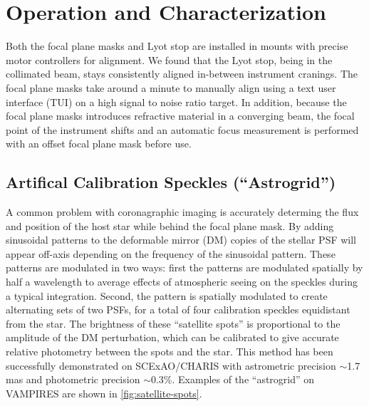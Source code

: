 \documentclass[]{spie}  %
\begin{document}
\section{Operation and Characterization}\label{sec:tests}

Both the focal plane masks and Lyot stop are installed in mounts with precise motor controllers for alignment. We found that the Lyot stop, being in the collimated beam, stays consistently aligned in-between instrument cranings. The focal plane masks take around a minute to manually align using a text user interface (TUI) on a high signal to noise ratio target. In addition, because the focal plane masks introduces refractive material in a converging beam, the focal point of the instrument shifts and an automatic focus measurement is performed with an offset focal plane mask before use.

\subsection{Artifical Calibration Speckles (``Astrogrid'')}

A common problem with coronagraphic imaging is accurately determing the flux and position of the host star while behind the focal plane mask. By adding sinusoidal patterns to the deformable mirror (DM) copies of the stellar PSF will appear off-axis depending on the frequency of the sinusoidal pattern\cite{sahoo2020}. These patterns are modulated in two ways: first the patterns are modulated spatially by half a wavelength to average effects of atmospheric seeing on the speckles during a typical integration. Second, the pattern is spatially modulated to create alternating sets of two PSFs, for a total of four calibration speckles equidistant from the star. The brightness of these ``satellite spots'' is proportional to the amplitude of the DM perturbation, which can be calibrated to give accurate relative photometry between the spots and the star. This method has been successfully demonstrated on SCExAO/CHARIS with astrometric precision $\sim$1.7 mas and photometric precision $\sim$0.3\%\cite{currie2020}. Examples of the ``astrogrid'' on VAMPIRES are shown in \autoref{fig:satellite-spots}.
\end{document}
